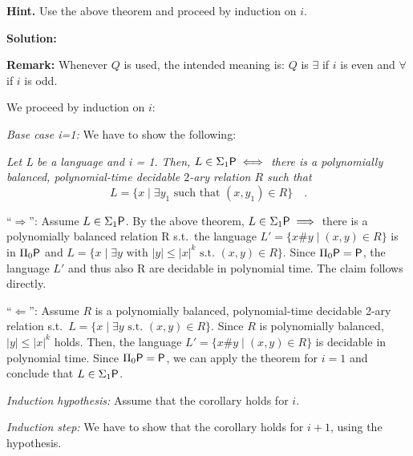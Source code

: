 \documentclass [11pt]{article}
\newcommand{\ccfont}[1]{\protect\mathsf{#1}}
\newcommand{\Ptime}{\ccfont{P}}
\newcommand{\phs}[1]{\Sigma_{#1}\Ptime}
\newcommand{\php}[1]{\Pi_{#1}\Ptime}
\newcommand{\Qoddeven}{$Q$ is $\exists$ if $i$ is even and $\forall$ if $i$ is odd}
\begin{document}
\noindent
{\bf Hint.} Use the above theorem and proceed by induction on $i$.


\bigskip
\noindent
\textbf{Solution:} 

\noindent
\textbf{Remark:} Whenever $Q$ is used, the intended meaning is: \Qoddeven.

\medskip
\noindent
We proceed by induction on $i$:

\noindent
\emph{Base case i=1:} We have to show the following:

\emph{Let L be a language and i = 1. Then,
$ L \in \phs{1} \iff$ there is a polynomially balanced, polynomial-time decidable $2$-ary
relation $R$ such that 
\[
L = \{x \mid \exists y_1 \mbox{ such
that } 
(x,y_1) \in R\}\quad .
\]}

``$\Rightarrow$'':
Assume $L \in \phs{1}$. 
By the above theorem, $L \in \phs{1} \implies$ there is a polynomially balanced relation R s.t.\ the language $L' = \{x\#y \mid (x,y) \in R\}$ is in $\php{0}$ and $L= \{x \mid \exists y \mbox{ with } |y| \leq |x|^k \mbox{ s.t. } (x,y) \in R\}$. 
Since $\php{0} = \Ptime$, the language $L'$ and thus also R are decidable in polynomial time. The claim follows directly.

``$\Leftarrow$'': Assume $R$ is a polynomially balanced, polynomial-time decidable 2-ary relation s.t.\ $L= \{x \mid \exists y \mbox{ s.t.\ } (x, y) \in R \}$. Since $R$ is polynomially balanced, $|y| \leq |x|^k$ holds. Then, the language $L' = \{x\#y \mid (x,y) \in R \}$ is decidable in polynomial time. Since $\php{0} = \Ptime$, we can apply the theorem for $i=1$ and conclude that  $L \in \phs{1}$.

\noindent
\emph{Induction hypothesis:}
Assume that the corollary holds for $i$.

\noindent
\emph{Induction step:}
We have to show that the corollary holds for $i+1$, using the hypothesis.
\end{document}
